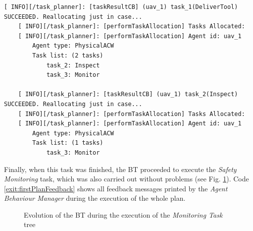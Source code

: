 \begin{lstlisting}[caption={Feedback messages printed out during replanning that were carried out when tasks were completed}, breaklines=true, label=exit:tasksFInishAndReplanning]
    [ INFO][/task_planner]: [taskResultCB] (uav_1) task_1(DeliverTool) SUCCEEDED. Reallocating just in case...
    [ INFO][/task_planner]: [performTaskAllocation] Tasks Allocated:
    [ INFO][/task_planner]: [performTaskAllocation] Agent id: uav_1
        Agent type: PhysicalACW
        Task list: (2 tasks)
            task_2: Inspect
            task_3: Monitor
    
    [ INFO][/task_planner]: [taskResultCB] (uav_1) task_2(Inspect) SUCCEEDED. Reallocating just in case...
    [ INFO][/task_planner]: [performTaskAllocation] Tasks Allocated:
    [ INFO][/task_planner]: [performTaskAllocation] Agent id: uav_1
        Agent type: PhysicalACW
        Task list: (1 tasks)
            task_3: Monitor
\end{lstlisting}

Finally, when this task was finished, the \gls{BT} proceeded to execute the \emph{Safety Monitoring} task, which was also carried out without problems (see Fig. \ref{fig:Gazebo_MonitorTree}). Code \ref{exit:firstPlanFeedback} shows all feedback messages printed by the \emph{Agent Behaviour Manager} during the execution of the whole plan. 

\begin{figure}[htbp]
    \centering
    \hfill
    \caption{Evolution of the \gls{BT} during the execution of the \emph{Monitoring Task} tree}
    \label{fig:Gazebo_MonitorTree}
\end{figure}

